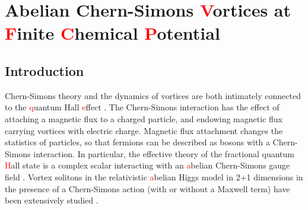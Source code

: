 \chapter{Abelian Chern-Simons \textcolor{red}{V}ortices at \textcolor{red}{F}inite \textcolor{red}{C}hemical \textcolor{red}{P}otential}
\label{ch:Chapter_2}
    \graphicspath{{Chapter_2_Folder/figures/PNG/}{Chapter_2_Folder/figures/PDF/}{Chapter_2_Folder/figures/}}


\section{Introduction}
Chern-Simons theory and the dynamics of vortices are both intimately connected to the \textcolor{red}{q}uantum Hall \textcolor{red}{e}ffect \cite{PhysRevLett.62.82}. The Chern-Simons interaction  has the effect of attaching a magnetic flux to a charged particle, and endowing magnetic flux carrying vortices  with electric charge.  Magnetic flux attachment changes the  statistics of particles, so that fermions can be described as bosons with a Chern-Simons interaction. In particular, the effective theory of the fractional quantum \textcolor{red}{H}all state is a complex scalar interacting with an \textcolor{red}{a}belian Chern-Simons gauge field \cite{PhysRevLett.62.82, Tong:2016kpv}.
Vortex solitons in the relativistic \textcolor{red}{a}belian Higgs model  in 2+1 dimensions in the presence  of a Chern-Simons action  (with or without a Maxwell term) have been extensively studied \cite{Paul:1986ix, Jackiw:1990aw, Hong:1990yh, Jackiw:1990pr, Dunne:1998qy, Horvathy:2008hd}.


